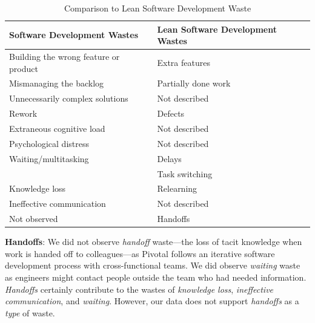 \begin{table}[t]
\renewcommand{\arraystretch}{1.5}
\centering
\caption{Comparison to Lean Software Development Waste}
\label{LeanSoftwareDevelopmentComparisonTable}
\begin{tabular}{|p{1.57in}|p{1.57in}|}
\hline
Software Development Wastes           & Lean Software Development Wastes \\ \hline
Building the wrong feature or product & Extra features                            \\ \hline
Mismanaging the backlog               & Partially done work                            \\ \hline
Unnecessarily complex solutions                & Not described                             \\ \hline
Rework                                & Defects                                   \\ \hline
Extraneous cognitive load                 & Not described  \\ \hline
Psychological distress                             & Not described \\ \hline
Waiting/multitasking                              & Delays                                    \\  
                  & Task switching  \\ \hline
Knowledge loss                 & Relearning                            \\ \hline
Ineffective communication             & Not described                             \\ \hline
Not observed                          & Handoffs                                  \\ \hline
\end{tabular}
\end{table}




\textbf{Handoffs}: We did not observe \textit{handoff} waste---the loss of tacit knowledge when work is handed off to colleagues---as Pivotal follows an iterative software development process with cross-functional teams. We did observe \textit{waiting} waste as engineers might contact people outside the team who had needed information. \textit{Handoffs} certainly contribute to the wastes of \textit{knowledge loss}, \textit{ineffective communication}, and \textit{waiting}. However, our data does not support \textit{handoffs} as a \textit{type} of waste.

